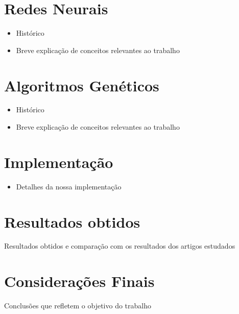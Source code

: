 \documentclass[12pt]{article}
\begin{document}
\section{Redes Neurais}

\begin{itemize}
\item Histórico
\item Breve explicação de conceitos relevantes ao trabalho
\end{itemize}

\section{Algoritmos Genéticos}

\begin{itemize}
\item Histórico
\item Breve explicação de conceitos relevantes ao trabalho
\end{itemize}

\section{Implementação}\label{sec:imple}

\begin{itemize}
\item Detalhes da nossa implementação
\end{itemize}

\section{Resultados obtidos}

Resultados obtidos e comparação com os resultados dos artigos estudados

\section{Considerações Finais}

Conclusões que refletem o objetivo do trabalho




\end{document}
